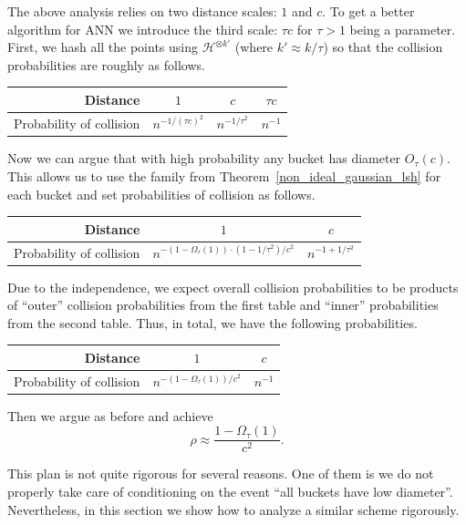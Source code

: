 \documentclass[11pt,letterpaper]{article}
\begin{document}
The above analysis relies on two distance scales: $1$ and $c$. To get
a better algorithm for ANN we introduce the third scale: $\tau c$ for
$\tau > 1$ being a parameter.  First, we hash all the points using
$\mathcal{H}^{\otimes k'}$ (where $k' \approx k / \tau$) so that the collision probabilities are
roughly as follows.

\begin{center}
\begin{tabular}{|r|c|c|c|}
    \hline
    Distance & $1$ & $c$ & $\tau c$\\
    \hline
    Probability of collision & $n^{-1/(\tau c)^2}$ & $n^{-1 / \tau^2}$ & $n^{-1}$\\
    \hline
\end{tabular}
\end{center}

Now we can argue that with high probability any bucket has diameter $O_{\tau}(c)$.
This allows us to use the family from Theorem~\ref{non_ideal_gaussian_lsh} for each bucket and set
probabilities of collision as follows.

\begin{center}
\begin{tabular}{|r|c|c|}
    \hline
    Distance & $1$ & $c$ \\
    \hline
    Probability of collision & $n^{-(1 - \Omega_{\tau}(1)) \cdot (1 - 1 / \tau^2) / c^2}$ & $n^{-1 + 1 / \tau^2}$\\
    \hline
\end{tabular}
\end{center}

Due to the independence, we expect overall collision probabilities to be products
of ``outer'' collision probabilities from the first table and ``inner'' probabilities
from the second table.
Thus, in total, we have the following probabilities.
\begin{center}
\begin{tabular}{|r|c|c|}
    \hline
    Distance & $1$ & $c$ \\
    \hline
    Probability of collision & $n^{-(1 - \Omega_{\tau}(1))/ c^2}$ & $n^{-1}$\\
    \hline
\end{tabular}
\end{center}
Then we argue as before and achieve
$$
    \rho \approx \frac{1 - \Omega_{\tau}(1)}{c^2}.
$$

This plan is not quite rigorous for several reasons.
One of them is we do not properly take care of conditioning on the event ``all buckets have low diameter''.
Nevertheless, in this section we show how to analyze a similar scheme rigorously.
\end{document}

